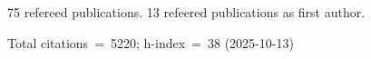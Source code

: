 75 refereed publications. 13 refeered publications as first author.

Total citations~=~5220; h-index~=~38 (2025-10-13)